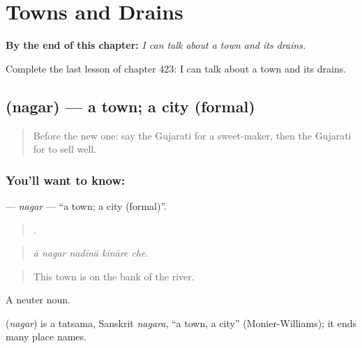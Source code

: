 
\chapter{Towns and Drains}
\label{ch:gu-towns-and-drains}

\begin{chapteropening}
\textbf{By the end of this chapter:} \emph{I can talk about a town and its drains.}

Complete the last lesson of chapter 423: I can talk about a town and its drains.
\end{chapteropening}

\section[\texorpdfstring{\gu{નગર} (nagar)}{નગર (nagar)}]{ (nagar) — a town; a city (formal)}

\label{lesson:GU-C423-nagar}



\begin{quote}
Before the new one: say the Gujarati for a sweet-maker, then the Gujarati for to sell well.
\end{quote}

\subsection*{You'll want to know: }
\textbf{} — \emph{nagar} — \textquotedblleft{}a town; a city (formal)\textquotedblright{}.

\begin{quote}
    .
\end{quote}

\begin{quote}
\emph{ā nagar nadīnā kināre che.}
\end{quote}

\begin{quote}
This town is on the bank of the river.
\end{quote}

A neuter noun.

\begin{cousinweb}
\textbf{} (\emph{nagar}) is a tatsama, Sanskrit \emph{nagara}, \textquotedblleft{}a town, a city\textquotedblright{} (Monier-Williams); it ends many place names.
\end{cousinweb}

